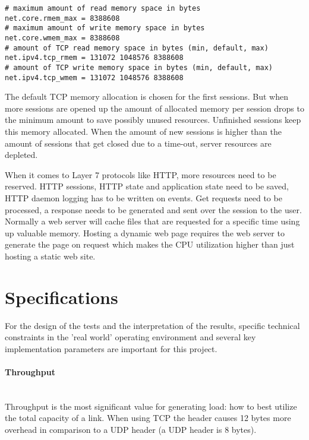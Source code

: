 \newpage

\begin{verbatim}
# maximum amount of read memory space in bytes
net.core.rmem_max = 8388608
# maximum amount of write memory space in bytes
net.core.wmem_max = 8388608
# amount of TCP read memory space in bytes (min, default, max)
net.ipv4.tcp_rmem = 131072 1048576 8388608
# amount of TCP write memory space in bytes (min, default, max)
net.ipv4.tcp_wmem = 131072 1048576 8388608
\end{verbatim}  

The default TCP memory allocation is chosen for the first sessions. But when more sessions are opened up the amount of allocated memory per session drops to the minimum amount to save possibly unused resources. 
Unfinished sessions keep this memory allocated. When the amount of new sessions is higher than the amount of sessions that get closed due to a time-out, server resources are depleted.

When it comes to Layer 7 protocols like HTTP, more resources need to be reserved. HTTP sessions, HTTP state and application state need to be saved, HTTP daemon logging has to be written on events.  Get requests need to be processed, a response needs to be generated and sent over the session to the user. Normally a web server will cache files that are requested for a specific time using up valuable memory. Hosting a dynamic web page requires the web server to generate the page on request which makes the CPU utilization higher than just hosting a static web site. 

\section{Specifications}\label{sec:specifications}
For the design of the tests and the interpretation of the results, specific technical constraints in the 'real world' operating environment and several key implementation parameters are important for this project.

\paragraph{Throughput}\label{par:throughput}\mbox{}\\
Throughput is the most significant value for generating load: how to best utilize the total capacity of a link. When using TCP the header causes 12 bytes more overhead in comparison to a UDP header (a UDP header is 8 bytes).


